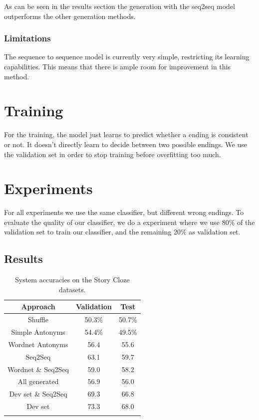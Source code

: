 \documentclass{article}
\begin{document}
As can be seen in the results section the generation with the seq2seq model outperforms the other generation methods.

\subsubsection{Limitations}
The sequence to sequence model is currently very simple, restricting its learning capabilities. This means that there is ample room for improvement in this method.


\section{Training}
For the training, the model just learns to predict whether a ending is consistent or not. It doesn't directly learn to decide between two possible endings. We use the validation set in order to stop training before overfitting too much.

\section{Experiments}
For all experiments we use the same classifier, but different wrong endings. To evaluate the quality of our classifier, we do a experiment where we use 80\% of the validation set to train our classifier, and the remaining 20\% as validation set.

\subsection{Results}
\begin{table}[h]
  \centering
  \begin{tabular}{ c c c}
    \toprule
    Approach & Validation & Test \\
    \midrule
    Shuffle & 50.3\% & 50.7\%\\
    Simple Antonyms & 54.4\% & 49.5\%\\
    Wordnet Antonyms & 56.4 & 55.6\\
    Seq2Seq & 63.1 & 59.7\\
    Wordnet \& Seq2Seq & 59.0 & 58.2\\
    All generated & 56.9 & 56.0\\
    Dev set \& Seq2Seq & 69.3 & 66.8\\
    Dev set & 73.3 & 68.0\\

    \bottomrule
    \\
  \end{tabular}
  \label{Tab:results}
  \caption{System accuracies on the Story Cloze datasets. }
\end{table}
\end{document}

